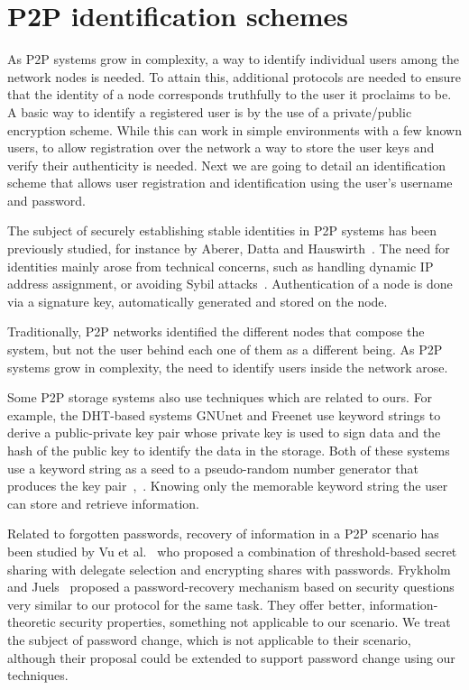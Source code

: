 \section{P2P identification schemes}

As P2P systems grow in complexity, a way to identify individual users among the
network nodes is needed. To attain this, additional protocols are needed to
ensure that the identity of a node corresponds truthfully to the user it
proclaims to be. A basic way to identify a registered user is by the use of
a private/public encryption scheme. While this can work in simple environments
with a few known users, to allow registration over the network a way to store
the user keys and verify their authenticity is needed.
Next we are going to detail an identification scheme that allows user
registration and identification using the user's username and password.


The subject of securely establishing stable identities in P2P
systems has been previously studied, for instance by Aberer,
Datta and Hauswirth~\cite{1318567}. The need for identities mainly arose
from technical concerns, such as handling dynamic IP address
assignment, or avoiding Sybil attacks~\cite{the_sybil_attack}. Authentication of a
node is done via a signature key, automatically generated and
stored on the node.

Traditionally, P2P networks identified the different nodes that compose the
system, but not the user behind each one of them as a different being.
As P2P systems grow in complexity, the need to identify users inside the
network arose.

Some P2P storage systems also use techniques which are
related to ours. For example, the DHT-based systems GNUnet
and Freenet use keyword strings to derive a public-private key
pair whose private key is used to sign data and the hash of
the public key to identify the data in the storage. Both of
these systems use a keyword string as a seed to a pseudo-random number
generator that produces the key pair~\cite{clarke2010private},~\cite{Bennett03anencoding}.
Knowing only the memorable keyword string the user can
store and retrieve information.

Related to forgotten passwords, recovery of information in a
P2P scenario has been studied by Vu et al.~\cite{5380695} who proposed
a combination of threshold-based secret sharing with delegate
selection and encrypting shares with passwords.
Frykholm and Juels~\cite{Frykholm:2001:EPR:501983.501985} proposed a password-recovery
mechanism based on security questions very similar to our
protocol for the same task. They offer better, information-
theoretic security properties, something not applicable to our
scenario. We treat the subject of password change, which is not applicable to
their scenario, although their proposal could be extended to support password
change using our techniques.


